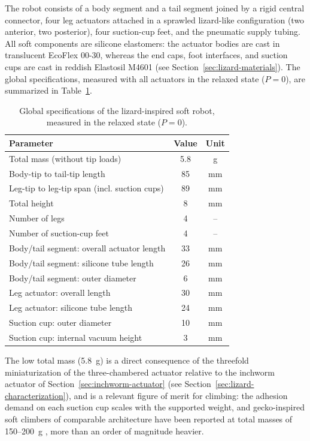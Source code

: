 The robot consists of a body segment and a tail segment joined by a rigid
central connector, four leg actuators attached in a sprawled
lizard-like configuration (two anterior, two posterior), four suction-cup
feet, and the pneumatic supply tubing. All soft components are silicone
elastomers: the actuator bodies are cast in translucent EcoFlex 00-30,
whereas the end caps, foot interfaces, and suction cups are cast in
reddish Elastosil M4601 (see Section~\ref{sec:lizard-materials}).
The global specifications, measured with all actuators in the relaxed
state ($P = 0$), are summarized in Table~\ref{tab:lizard-global-specs}.

\begin{table}[tb]
  \caption{Global specifications of the lizard-inspired soft robot,
  measured in the relaxed state ($P=0$).}
  \label{tab:lizard-global-specs}
  \centering
  \begin{tabular}{|l|c|c|}
    \hline
    Parameter & Value & Unit \\ \hline
    Total mass (without tip loads) & 5.8 & g \\ \hline
    Body-tip to tail-tip length & 85 & mm \\ \hline
    Leg-tip to leg-tip span (incl. suction cups) & 89 & mm \\ \hline
    Total height & 8 & mm \\ \hline
    Number of legs & 4 & -- \\ \hline
    Number of suction-cup feet & 4 & -- \\ \hline
    Body/tail segment: overall actuator length & 33 & mm \\ \hline
    Body/tail segment: silicone tube length & 26 & mm \\ \hline
    Body/tail segment: outer diameter & 6 & mm \\ \hline
    Leg actuator: overall length & 30 & mm \\ \hline
    Leg actuator: silicone tube length & 24 & mm \\ \hline
    Suction cup: outer diameter & 10 & mm \\ \hline
    Suction cup: internal vacuum height & 3 & mm \\ \hline
  \end{tabular}
\end{table}

The low total mass (5.8~g) is a direct consequence of the threefold
miniaturization of the three-chambered actuator relative to
the inchworm actuator of Section~\ref{sec:inchworm-actuator} (see
Section~\ref{sec:lizard-characterization}), and is a relevant figure of
merit for climbing: the adhesion demand on each suction cup scales with
the supported weight, and gecko-inspired soft climbers of comparable
architecture have been reported at total masses of 150--200~g
\cite{Schiller2019GeckoInspired}, more than an order of magnitude heavier.

